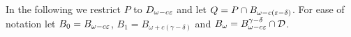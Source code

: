
In the following we restrict $P$ to $D_{\omega-c\varepsilon}$ and let $Q = P\cap B_{\omega - c(\varepsilon - \delta)}$.
For ease of notation let $B_0 = B_{\omega - c\varepsilon}$, $B_1 = B_{\omega + c(\gamma-\delta)}$ and $B_{\omega} = B_{\omega-c\varepsilon}^{\gamma-\delta}\cap{\mathcal{D}}$.

